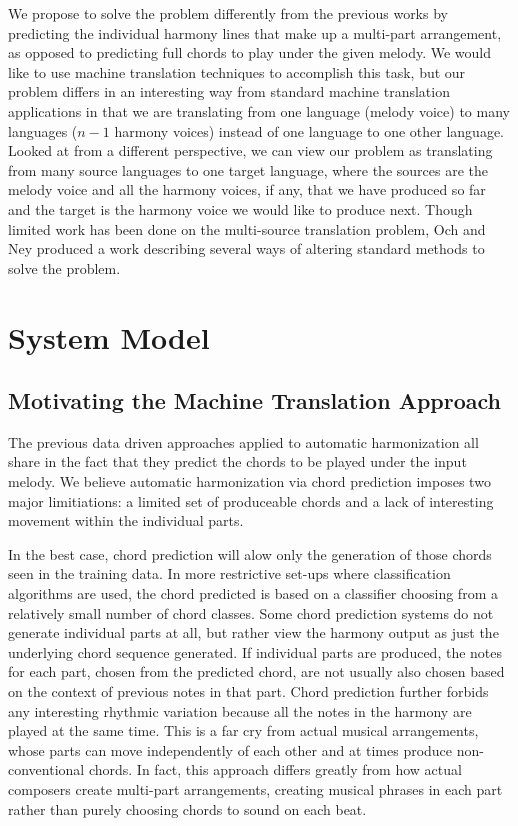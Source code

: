 \documentclass{sig-alternate}
\begin{document}
We propose to solve the problem differently from the previous works by predicting the individual harmony lines that make up
a multi-part arrangement, as opposed to predicting full chords to play under the given melody. We would like to use machine
translation techniques to accomplish this task, but our problem differs in an interesting way from standard machine translation
applications in that we are translating from one language (melody voice) to many languages ($n - 1$ harmony voices) instead of one language to one other language. Looked at from a different perspective, we can view our problem as translating from many source 
languages to one target language, where the sources are the melody voice and all the harmony voices, if any, that we have produced
so far and the target is the harmony voice we would like to produce next. Though limited work has been done on the multi-source
translation problem, Och and Ney \cite{franzjosefochhermannney2001} produced a work describing several ways of altering standard methods to solve the problem.

\section{System Model}
\label{sec:sys_model}
\subsection{Motivating the Machine Translation Approach}

The previous data driven approaches applied to automatic harmonization all share in the fact that they predict the chords to be played under the input melody. We believe automatic harmonization via chord prediction imposes two major limitiations: a limited set of produceable chords and a lack of interesting movement within the individual parts. 

In the best case, chord prediction will alow only the generation of those chords seen in the training data. In more restrictive set-ups where classification algorithms are used, the chord predicted is based on a classifier choosing from a relatively small number of chord classes. Some chord prediction systems do not generate individual parts at all, but rather view the harmony output as just the underlying chord sequence generated. If individual parts are produced, the notes for each part, chosen from the predicted chord, are not usually also chosen based on the context of previous notes in that part. Chord prediction further forbids any interesting rhythmic variation because all the notes in the harmony are played at the same time. This is a far cry from actual musical arrangements, whose parts can move independently of each other and at times produce non-conventional chords. In fact, this approach differs greatly from how actual composers create multi-part arrangements, creating musical phrases in each part rather than purely choosing chords to sound on each beat.
\end{document}
